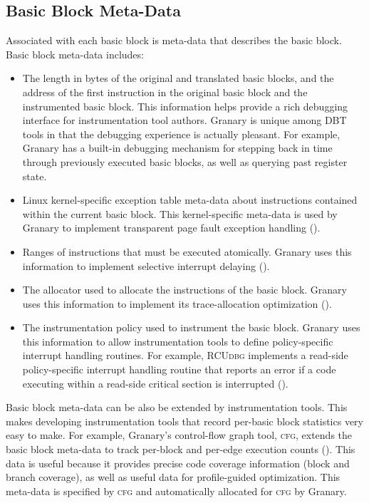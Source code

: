 \documentclass[preprint]{sigplanconf}
\newcommand{\toolname}[1]{{\scshape #1}}
\begin{document}
\subsection{Basic Block Meta-Data}\label{sec:metadata}

Associated with each basic block is meta-data that describes the basic block. Basic block meta-data includes: \begin{itemize}
	\item The length in bytes of the original and translated basic blocks, and the address of the first instruction in the original basic block and the instrumented basic block. This information helps provide a rich debugging interface for instrumentation tool authors. Granary is unique among DBT tools in that the debugging experience is actually pleasant. For example, Granary has a built-in debugging mechanism for stepping back in time through previously executed basic blocks, as well as querying past register state.
	\item Linux kernel-specific exception table meta-data about instructions contained within the current basic block. This kernel-specific meta-data is used by Granary to implement transparent page fault exception handling ().
	\item Ranges of instructions that must be executed atomically. Granary uses this information to implement selective interrupt delaying ().
	\item The allocator used to allocate the instructions of the basic block. Granary uses this information to implement its trace-allocation optimization ().
	\item The instrumentation policy used to instrument the basic block. Granary uses this information to allow instrumentation tools to define policy-specific interrupt handling routines. For example, \toolname{RCUdbg} implements a read-side policy-specific interrupt handling routine that reports an error if a code executing within a read-side critical section is interrupted ().
\end{itemize} %

Basic block meta-data can be also be extended by instrumentation tools. This makes developing instrumentation tools that record per-basic block statistics very easy to make. For example, Granary's control-flow graph tool, \toolname{cfg}, extends the basic block meta-data to track per-block and per-edge execution counts (). This data is useful because it provides precise code coverage information (block and branch coverage), as well as useful data for profile-guided optimization. This meta-data is specified by \toolname{cfg} and automatically allocated for \toolname{cfg} by Granary. 
\end{document}
